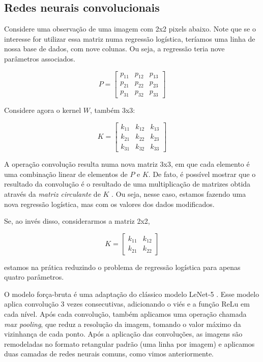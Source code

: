 \documentclass[12pt,]{report}
\begin{document}
\subsection{Redes neurais
convolucionais}\label{redes-neurais-convolucionais}

Considere uma observação de uma imagem com 2x2 pixels abaixo. Note que
se o interesse for utilizar essa matriz numa regressão logística,
teríamos uma linha de nossa base de dados, com nove colunas. Ou seja, a
regressão teria nove parâmetros associados.

\[
P = \left[\begin{array}{rrr}
p_{11} & p_{12} & p_{13} \\ 
p_{21} & p_{22} & p_{23} \\
p_{31} & p_{32} & p_{33}
\end{array}\right]
\]

Considere agora o kernel \(W\), também 3x3:

\[
K = \left[\begin{array}{rrr}
k_{11} & k_{12} & k_{13} \\ 
k_{21} & k_{22} & k_{23} \\
k_{31} & k_{32} & k_{33}
\end{array}\right]
\]

A operação convolução resulta numa nova matriz 3x3, em que cada elemento
é uma combinação linear de elementos de \(P\) e \(K\). De fato, é
possível mostrar que o resultado da convolução é o resultado de uma
multiplicação de matrizes obtida através da \emph{matriz circulante} de
\(K\) \citep{gray2006toeplitz}. Ou seja, nesse caso, estamos fazendo uma
nova regressão logística, mas com os valores dos dados modificados.

Se, ao invés disso, considerarmos a matriz 2x2,

\[
K = \left[\begin{array}{rr}
k_{11} & k_{12}\\ 
k_{21} & k_{22}
\end{array}\right]
\]

estamos na prática reduzindo o problema de regressão logística para
apenas quatro parâmetros.

O modelo força-bruta é uma adaptação do clássico modelo LeNet-5
\citep{lecun2015lenet}. Esse modelo aplica convolução 3 vezes
consecutivas, adicionando o viés e a função ReLu em cada nível. Após
cada convolução, também aplicamos uma operação chamada \emph{max
pooling}, que reduz a resolução da imagem, tomando o valor máximo da
vizinhança de cada ponto. Após a aplicação das convoluções, as imagens
são remodeladas no formato retangular padrão (uma linha por imagem) e
aplicamos duas camadas de redes neurais comuns, como vimos
anteriormente.
\end{document}
